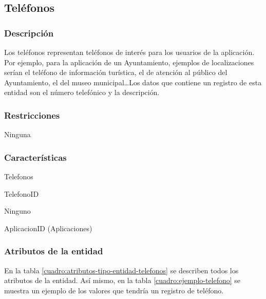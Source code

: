 \subsection{Teléfonos}

\subsubsection*{Descripción}
Los teléfonos representan teléfonos de interés para los usuarios de la aplicación. Por ejemplo, para la aplicación de un Ayuntamiento, ejemplos de localizaciones serían el teléfono de información turística, el de atención al público del Ayuntamiento, el del museo municipal\dots Los datos que contiene un registro de esta entidad son el número telefónico y la descripción.

\subsubsection*{Restricciones}
Ninguna

\subsubsection*{Características}
\begin{description}[nosep,style=multiline,labelindent=0.8cm,leftmargin=4.5cm,font=\normalfont]
    \item[Nombre] Telefonos
    \item[Id. principal] TelefonoID
    \item[Id. alternativo] Ninguno
    \item[Atrib. heredados] AplicacionID (Aplicaciones)
\end{description}

\subsubsection*{Atributos de la entidad}
En la tabla \ref{cuadro:atributos-tipo-entidad-telefonos} se describen todos los atributos de la entidad. Así mismo, en la tabla \ref{cuadro:ejemplo-telefono} se muestra un ejemplo de los valores que tendría un registro de teléfono.

